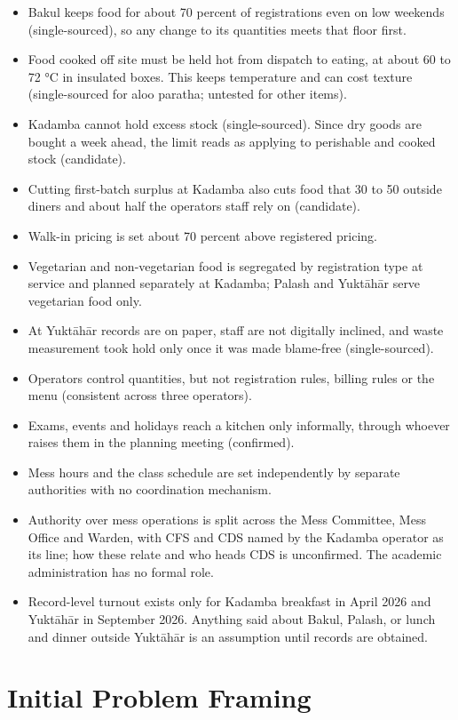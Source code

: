 \documentclass[
  10pt,
  table]{article}
\begin{document}
\begin{itemize}
\item
  Bakul keeps food for about 70 percent of registrations even on low weekends (single-sourced), so any change to its quantities meets that floor first.
\item
  Food cooked off site must be held hot from dispatch to eating, at about 60 to 72 °C in insulated boxes. This keeps temperature and can cost texture (single-sourced for aloo paratha; untested for other items).
\item
  Kadamba cannot hold excess stock (single-sourced). Since dry goods are bought a week ahead, the limit reads as applying to perishable and cooked stock (candidate).
\item
  Cutting first-batch surplus at Kadamba also cuts food that 30 to 50 outside diners and about half the operator\textquotesingle s staff rely on (candidate).
\item
  Walk-in pricing is set about 70 percent above registered pricing.
\item
  Vegetarian and non-vegetarian food is segregated by registration type at service and planned separately at Kadamba; Palash and Yuktāhār serve vegetarian food only.
\item
  At Yuktāhār records are on paper, staff are not digitally inclined, and waste measurement took hold only once it was made blame-free (single-sourced).
\item
  Operators control quantities, but not registration rules, billing rules or the menu (consistent across three operators).
\item
  Exams, events and holidays reach a kitchen only informally, through whoever raises them in the planning meeting (confirmed).
\item
  Mess hours and the class schedule are set independently by separate authorities with no coordination mechanism.
\item
  Authority over mess operations is split across the Mess Committee, Mess Office and Warden, with CFS and CDS named by the Kadamba operator as its line; how these relate and who heads CDS is unconfirmed. The academic administration has no formal role.
\item
  Record-level turnout exists only for Kadamba breakfast in April 2026 and Yuktāhār in September 2026. Anything said about Bakul, Palash, or lunch and dinner outside Yuktāhār is an assumption until records are obtained.
\end{itemize}

\section{Initial Problem Framing}\label{initial-problem-framing}
\end{document}
